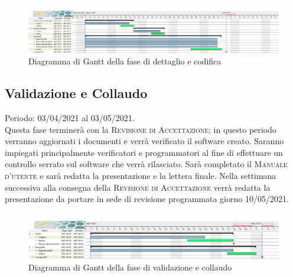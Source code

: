 \documentclass[../piano_di_progetto.tex]{subfiles}
\begin{document}
\begin{figure}[H]
\centering
\includegraphics[width=18cm]{src/img/gantt/03_RQ.png}
\caption{Diagramma di Gantt della fase di dettaglio e codifica}
\end{figure}

\subsection{Validazione e Collaudo}%
\label{sub:valid_coll}
Periodo: 03/04/2021 al 03/05/2021.\\
Questa fase terminerà con la \textsc{Revisione di Accettazione}; in questo periodo verranno aggiornati i documenti e verrà verificato il software creato. Saranno impiegati principalmente verificatori e programmatori al fine di effettuare un controllo serrato sul software che verrà rilasciato. Sarà completato il \textsc{Manuale d'utente} e sarà redatta la presentazione e la lettera finale. Nella settimana successiva alla consegna della \textsc{Revisione di Accettazione} verrà redatta la presentazione da portare in sede di revisione programmata giorno 10/05/2021.

\begin{figure}[H]
\centering
\includegraphics[width=18cm]{src/img/gantt/04_RA.png}
\caption{Diagramma di Gantt della fase di validazione e collaudo}
\end{figure}
\end{document}
